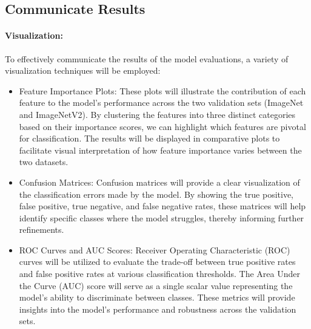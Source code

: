 \documentclass[a4paper,11pt]{article}
\begin{document}
\subsection{Communicate Results}

\paragraph{Visualization:}  
To effectively communicate the results of the model evaluations, a variety of visualization techniques will be employed:
\begin{itemize}
    \item Feature Importance Plots: These plots will illustrate the contribution of each feature to the model's performance across the two validation sets (ImageNet and ImageNetV2). By clustering the features into three distinct categories based on their importance scores, we can highlight which features are pivotal for classification. The results will be displayed in comparative plots to facilitate visual interpretation of how feature importance varies between the two datasets.
    \item Confusion Matrices: Confusion matrices will provide a clear visualization of the classification errors made by the model. By showing the true positive, false positive, true negative, and false negative rates, these matrices will help identify specific classes where the model struggles, thereby informing further refinements.
    \item ROC Curves and AUC Scores: Receiver Operating Characteristic (ROC) curves will be utilized to evaluate the trade-off between true positive rates and false positive rates at various classification thresholds. The Area Under the Curve (AUC) score will serve as a single scalar value representing the model's ability to discriminate between classes. These metrics will provide insights into the model’s performance and robustness across the validation sets.
\end{itemize}
\end{document}
